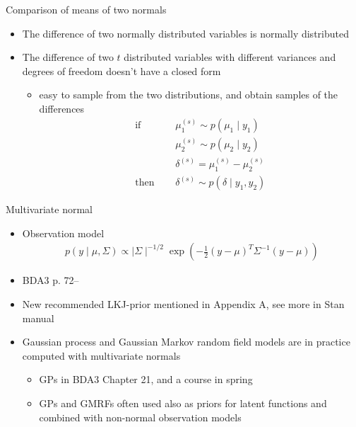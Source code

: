 \documentclass[finnish,english,t]{beamer}
\begin{document}
\begin{frame}{Comparison of means of two normals}

  \begin{itemize}
  \item The difference of two normally distributed variables is
    normally distributed
  \item The difference of two $t$ distributed variables with different
    variances and degrees of freedom doesn't have a closed form
    \begin{itemize}
    \item easy to sample from the two distributions, and obtain
      samples of the differences
      \begin{align*}
        \text{if }\quad & \mu_1^{(s)} \sim p(\mu_1 \mid y_1) \\
        & \mu_2^{(s)}  \sim p(\mu_2 \mid y_2) \\
        & \delta^{(s)} = \mu_1^{(s)} - \mu_2^{(s)} \\
        \text{then }\quad & \delta^{(s)} \sim p(\delta \mid y_1, y_2)
      \end{align*}
    \end{itemize}
  \end{itemize}
  
\end{frame}

\begin{frame}{Multivariate normal}

  \begin{itemize}
  \item Observation model
    \begin{align*}
      p(y \mid \mu,\Sigma)\propto  \mid \Sigma \mid ^{-1/2}
      \exp\left( -\frac{1}{2} (y-\mu)^T \Sigma^{-1} (y-\mu)\right)
    \end{align*}
  \item BDA3 p. 72--
  \item New recommended LKJ-prior mentioned in Appendix A, see more
    in Stan manual
  \item<2-> Gaussian process and Gaussian Markov random field models
    are in practice computed with multivariate normals
    \begin{itemize}
    \item GPs in BDA3 Chapter 21, and a course in spring
    \item GPs and GMRFs often used also as priors for latent
      functions and combined with non-normal observation models
    \end{itemize}
  \end{itemize}
\end{frame}
\end{document}
